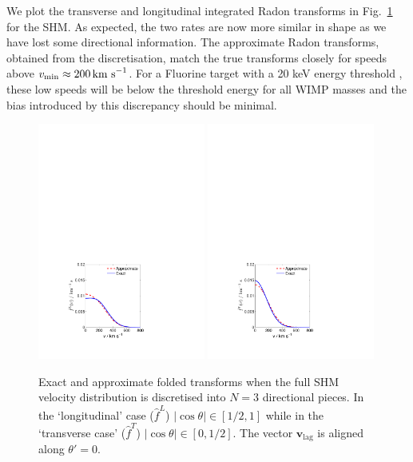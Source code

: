 We plot the transverse and longitudinal integrated Radon transforms in Fig.~\ref{fig:directional:radonN3folded} for the SHM. As expected, the two rates are now more similar in shape as we have lost some directional information. The approximate Radon transforms, obtained from the discretisation, match the true transforms closely for speeds above $\vmin\approx 200 \kms$. For a Fluorine target with a 20 keV energy threshold \cite{Daw:2011}, these low speeds will be below the threshold energy for all WIMP masses and the bias introduced by this discrepancy should be minimal. 

\begin{figure}[t]

  \centering

  \includegraphics[trim={3.5cm 2cm 7.5cm 17cm},clip,width=0.49\textwidth]{Directional/SHMfolded_N3_L.pdf}
  \includegraphics[trim={3.5cm 2cm 7.5cm 17cm},clip,width=0.49\textwidth]{Directional/SHMfolded_N3_T.pdf}

\caption[True and approximate folded Radon transforms for $N=3$ components in the SHM]{Exact and approximate folded transforms when the full SHM velocity distribution is discretised into $N = 3$ directional pieces. In the `longitudinal' case ($\hat{f}^L$) $|\cos\theta| \in [1/2,1]$ while in the `transverse case' ($\hat{f}^T$) $|\cos\theta| \in [0, 1/2]$. The vector $\textbf{v}_\textrm{lag}$ is aligned along $\theta' = 0$.}
\label{fig:directional:radonN3folded}
\end{figure}

